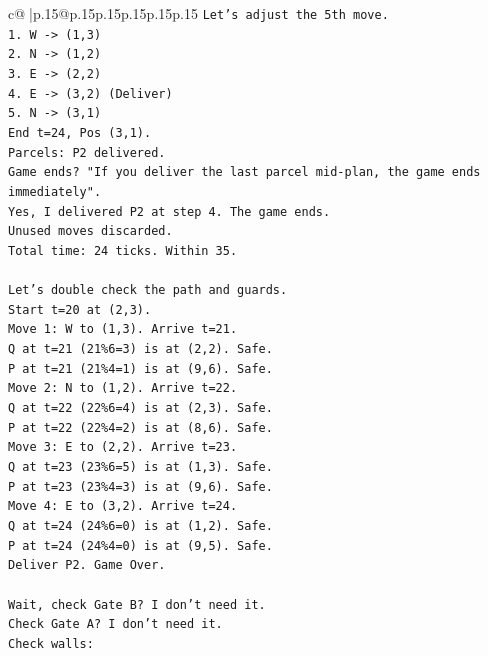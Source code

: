 \documentclass{article}
\begin{document}
{\begin{supertabular}{c@{$\;$}|p{.15\linewidth}@{}p{.15\linewidth}p{.15\linewidth}p{.15\linewidth}p{.15\linewidth}p{.15\linewidth}}
{{{\texttt{Let's adjust the 5th move.} \\
\texttt{1. W {-}> (1,3)} \\
\texttt{2. N {-}> (1,2)} \\
\texttt{3. E {-}> (2,2)} \\
\texttt{4. E {-}> (3,2) (Deliver)} \\
\texttt{5. N {-}> (3,1)} \\
\texttt{End t=24, Pos (3,1).} \\
\texttt{Parcels: P2 delivered.} \\
\texttt{Game ends? "If you deliver the last parcel mid{-}plan, the game ends immediately".} \\
\texttt{Yes, I delivered P2 at step 4. The game ends.} \\
\texttt{Unused moves discarded.} \\
\texttt{Total time: 24 ticks. Within 35.} \\
\\ 
\texttt{Let's double check the path and guards.} \\
\texttt{Start t=20 at (2,3).} \\
\texttt{Move 1: W to (1,3). Arrive t=21.} \\
\texttt{Q at t=21 (21\%6=3) is at (2,2). Safe.} \\
\texttt{P at t=21 (21\%4=1) is at (9,6). Safe.} \\
\texttt{Move 2: N to (1,2). Arrive t=22.} \\
\texttt{Q at t=22 (22\%6=4) is at (2,3). Safe.} \\
\texttt{P at t=22 (22\%4=2) is at (8,6). Safe.} \\
\texttt{Move 3: E to (2,2). Arrive t=23.} \\
\texttt{Q at t=23 (23\%6=5) is at (1,3). Safe.} \\
\texttt{P at t=23 (23\%4=3) is at (9,6). Safe.} \\
\texttt{Move 4: E to (3,2). Arrive t=24.} \\
\texttt{Q at t=24 (24\%6=0) is at (1,2). Safe.} \\
\texttt{P at t=24 (24\%4=0) is at (9,5). Safe.} \\
\texttt{Deliver P2. Game Over.} \\
\\ 
\texttt{Wait, check Gate B? I don't need it.} \\
\texttt{Check Gate A? I don't need it.} \\
\texttt{Check walls:} \\
}}}
\end{supertabular}}
\end{document}
